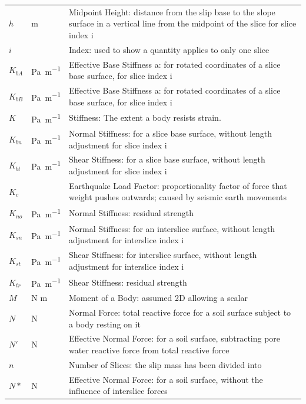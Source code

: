 \documentclass[12pt]{article}
\begin{document}
\begin{longtable}{  l  l  p{8.5cm}  }
\\
$h$ &  \si{\meter}&Midpoint Height: distance from the slip base to the slope surface in a vertical line from the midpoint of the slice for slice index i
\\
$i$ & & Index: used to show a quantity applies to only one slice 
\\
${K_{bA}}$ &\si{\pascal\per\meter} & Effective Base Stiffness a: for rotated coordinates of a slice base surface, for slice index i
\\
${K_{bB}}$ &\si{\pascal\per\meter} & Effective Base Stiffness a: for rotated coordinates of a slice base surface, for slice index i
\\
$K$ &  \si{\pascal\per\meter} &Stiffness: The extent a body resists strain.
\\
${K_{bn}}$ & \si{\pascal\per\meter} & Normal Stiffness: for a slice base surface, without length adjustment for slice index i
\\
${K_{bt}}$ & \si{\pascal\per\meter} & Shear Stiffness: for a slice base surface, without length adjustment for slice index i
\\
${K_{c}}$ & & Earthquake Load Factor: proportionality factor of force that weight pushes outwards; caused by seismic earth movements 
\\
${K_{no}}$ &\si{\pascal\per\meter} & Normal Stiffness: residual strength
\\
${K_{sn}}$ &\si{\pascal\per\meter} & Normal Stiffness: for an interslice surface, without length adjustment for interslice index i
\\
${K_{st}}$ & \si{\pascal\per\meter} & Shear Stiffness: for interslice surface, without length adjustment for interslice index i
\\
${K_{tr}}$ &\si{\pascal\per\meter} & Shear Stiffness: residual strength
\\
$M$ & N  \si{\meter}& Moment of a Body: assumed 2D allowing a scalar
\\
$N$ & \si{\newton} & Normal Force: total reactive force for a soil surface subject to a body resting on it
\\
$N'$ &\si{\newton} & Effective Normal Force: for a soil surface, subtracting pore water reactive force from total reactive force 
\\
$n$ & & Number of Slices: the slip mass has been divided into  
\\
$N*$ &\si{\newton} & Effective Normal Force: for a soil surface, without the influence of interslice forces
\\

\end{longtable}
\end{document}
